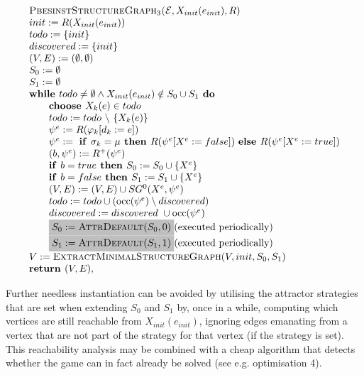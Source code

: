 \documentclass{article}
\newcommand{\Space}{\text{\ }}
\newcommand{\If}{\text{\textbf{if }}}
\newcommand{\Do}{\text{\textbf{ do }}}
\newcommand{\Then}{\text{\textbf{ then }}}
\newcommand{\Else}{\text{\textbf{else }}}
\newcommand{\While}{\text{\textbf{while }}}
\newcommand{\Choose}{\text{\textbf{choose }}}
\newcommand{\Return}{\text{\textbf{return }}}
\begin{document}
\begin{equation*}
\begin{array}{l}
\textsc{PbesinstStructureGraph$_{3}$(}\mathcal{E}, X_{init}(e_{init}), R) \\ 
init:=R(X_{init}(e_{init})) \\
todo:=\{init\} \\
discovered:=\{init\} \\
(V,E) :=(\emptyset ,\emptyset ) \\ 
S_0:= \emptyset \\
S_1:= \emptyset \\
\While todo \neq \emptyset \wedge X_{init}(e_{init}) \notin S_0 \cup S_1 \Do \\ 
\qquad \Choose X_{k}(e)\in todo \\ 
\qquad todo:=todo\ \backslash \ \{X_{k}(e)\} \\ 
\qquad \psi ^{e}:=R(\varphi _{k}[d_{k}:=e]) \\ 
\qquad \psi^e := \Space \If \sigma_k = \mu \Then R(\psi^e[X^e := false])
\Space \Else R(\psi^e[X^e := true]) \\
\qquad (b,\psi^e) := R^+(\psi^e) \\
\qquad \If b = true \Then S_0 := S_0 \cup \{ X^e \}\\
\qquad \If b = false \Then S_1 := S_1 \cup \{ X^e \}\\
\qquad (V,E) := (V,E) \cup SG^{0}(X^{e},\psi ^{e}) \\ 
\qquad todo:=todo\cup (\mathrm{occ}(\psi ^{e})\setminus discovered) \\
\qquad discovered:=discovered\ \cup \mathrm{occ}(\psi ^{e}) \\
\qquad \colorbox{lightgray}{$S_0 := \textsc{AttrDefault}(S_0, 0) $}
\text{(executed periodically)} \\
\qquad \colorbox{lightgray}{$S_1 := \textsc{AttrDefault}(S_1, 1) $}
\text{(executed periodically)} \\
V := \textsc{ExtractMinimalStructureGraph}(V, init, S_0, S_1) \\
\Return(V, E),
\end{array}
\end{equation*}

Further needless instantiation can be avoided by utilising the attractor
strategies that are set when extending $S_0$ and $S_1$ by, once in a while, computing
which vertices are still reachable from $X_\textit{init}(e_\textit{init})$, ignoring
edges emanating from a vertex that are not part of the strategy for that vertex (if the
strategy is set). This reachability analysis may be combined with a cheap algorithm that
detects whether the game can in fact already be solved (see e.g. optimisation 4). 
\end{document}
